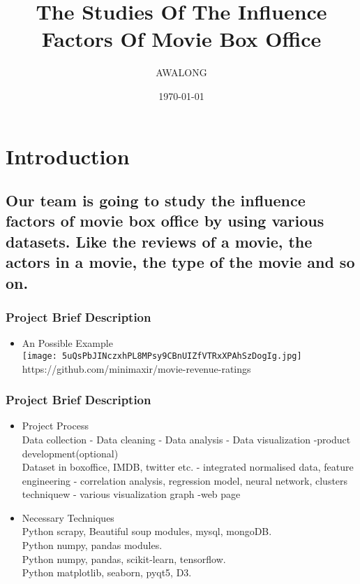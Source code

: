 \documentclass{beamer}
\title{The Studies Of The Influence Factors Of Movie Box Office}
\author{AWALONG}
\date{\today}
\begin{document}
\frame{\titlepage}

\section[Outline]{}
\frame{\tableofcontents}

\section{Introduction}
\subsection{Our team is going to study the influence factors of movie box office by using various datasets. Like the reviews of a movie, the actors in a movie, the type of the movie and so on.}

\frame
{
  \frametitle{Project Brief Description}

  \begin{itemize}
  \item<1-> An Possible Example\\
  \texttt{[image: 5uQsPbJINczxhPL8MPsy9CBnUIZfVTRxXPAhSzDogIg.jpg]}\\
  https://github.com/minimaxir/movie-revenue-ratings
  \end{itemize}
}

\frame
{
  \frametitle{Project Brief Description}

  \begin{itemize}
  \item<1-> Project Process\\
Data collection - Data cleaning - Data analysis - Data visualization -product development(optional)\\
Dataset in boxoffice, IMDB, twitter etc.  - integrated normalised data, feature engineering - correlation analysis, regression model, neural network, clusters techniquew - various visualization graph -web page
  \item<2-> Necessary Techniques\\
Python scrapy, Beautiful soup modules, mysql, mongoDB.\\
Python numpy, pandas modules.\\
Python numpy, pandas, scikit-learn, tensorflow.\\
Python matplotlib, seaborn, pyqt5, D3.\\  
  \end{itemize}
}
\end{document}
